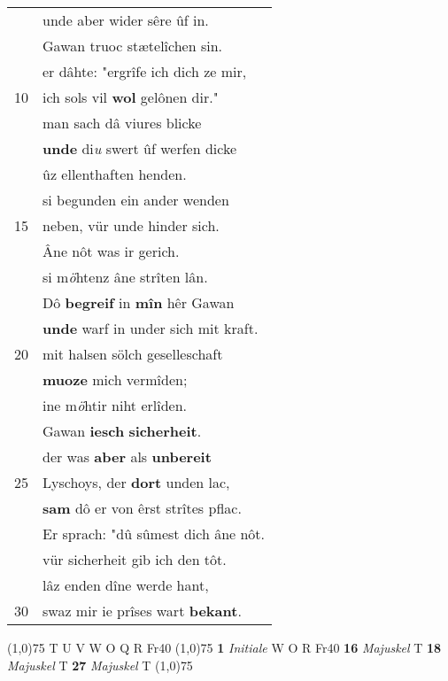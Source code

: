 \documentclass[8pt,a4paper,notitlepage]{article}
\begin{document}
\begin{table}[ht]
\begin{minipage}[t]{0.5\linewidth}
\begin{tabular}{rl}
 & unde aber wider sêre ûf in.\\ 
 & Gawan truoc stætelîchen sin.\\ 
 & er dâhte: "ergrîfe ich dich ze mir,\\ 
10 & ich sols vil \textbf{wol} gelônen dir."\\ 
 & man sach dâ viures blicke\\ 
 & \textbf{unde} di\textit{u} swert ûf werfen dicke\\ 
 & ûz ellenthaften henden.\\ 
 & si begunden ein ander wenden\\ 
15 & neben, vür unde hinder sich.\\ 
 & Âne nôt was ir gerich.\\ 
 & si m\textit{ö}htenz âne strîten lân.\\ 
 & Dô \textbf{begreif} in \textbf{mîn} hêr Gawan\\ 
 & \textbf{unde} warf in under sich mit kraft.\\ 
20 & mit halsen sölch geselleschaft\\ 
 & \textbf{muoze} mich vermîden;\\ 
 & ine m\textit{ö}htir niht erlîden.\\ 
 & Gawan \textbf{iesch} \textbf{sicherheit}.\\ 
 & der was \textbf{aber} als \textbf{unbereit}\\ 
25 & Lyschoys, der \textbf{dort} unden lac,\\ 
 & \textbf{sam} dô er von êrst strîtes pflac.\\ 
 & Er sprach: "dû sûmest dich âne nôt.\\ 
 & vür sicherheit gib ich den tôt.\\ 
 & lâz enden dîne werde hant,\\ 
30 & swaz mir ie prîses wart \textbf{bekant}.\\ 
\end{tabular}
\scriptsize
\line(1,0){75} \newline
T U V W O Q R Fr40 \newline
\line(1,0){75} \newline
\textbf{1} \textit{Initiale} W O R Fr40  \textbf{16} \textit{Majuskel} T  \textbf{18} \textit{Majuskel} T  \textbf{27} \textit{Majuskel} T  \newline
\line(1,0){75} \newline

\end{minipage}
\end{table}
\end{document}
